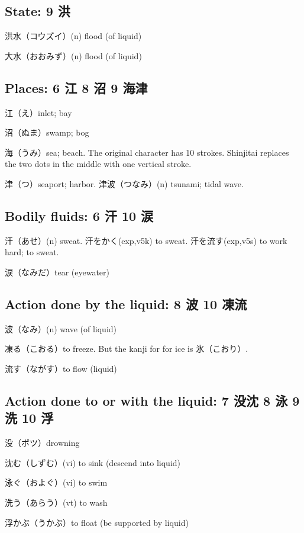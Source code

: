 \subsection{State: 9 洪}

洪水（コウズイ）(n) flood (of liquid)

大水（おおみず）(n) flood (of liquid)

\subsection{Places: 6 江 8 沼 9 海津}

江（え）inlet; bay

沼（ぬま）swamp; bog

海（うみ）sea; beach.
The original character has 10 strokes.
Shinjitai replaces the two dots in the middle
with one vertical stroke.

津（つ）seaport; harbor.
津波（つなみ）(n) tsunami; tidal wave.

\subsection{Bodily fluids: 6 汗 10 涙}

汗（あせ）(n) sweat.
汗をかく(exp,v5k) to sweat.
汗を流す(exp,v5s) to work hard; to sweat.

涙（なみだ）tear (eyewater)

\subsection{Action done by the liquid: 8 波 10 凍流}

波（なみ）(n) wave (of liquid)

凍る（こおる）to freeze.
But the kanji for for ice is 氷（こおり）.

流す（ながす）to flow (liquid)

\subsection{Action done to or with the liquid: 7 没沈 8 泳 9 洗 10 浮}

没（ボツ）drowning

沈む（しずむ）(vi) to sink (descend into liquid)

泳ぐ（およぐ）(vi) to swim

洗う（あらう）(vt) to wash

浮かぶ（うかぶ）to float (be supported by liquid)

